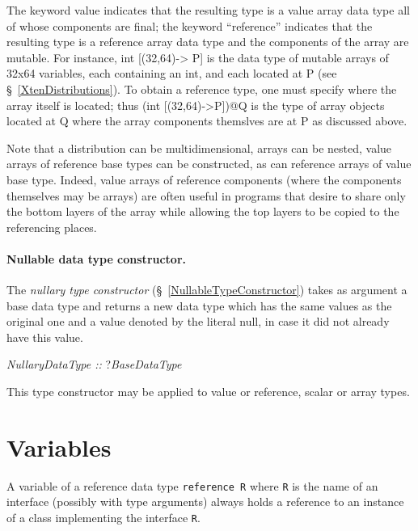 
The keyword {\cf value} indicates that the resulting type is a value
array data type all of whose components are final; the keyword
``reference'' indicates that the resulting type is a reference array
data type and the components of the array are mutable.  For instance,
{\cf int [(32,64)-> P]} is the data type of mutable arrays of {\cf
32x64} variables, each containing an {\cf int}, and each located at
{\cf P} (see \S~\ref{XtenDistributions}).  To obtain a reference type,
one must specify where the array itself is located; thus {\cf (int
[(32,64)->P])@Q} is the type of array objects located at {\cf Q} where
the array components themslves are at {\cf P} as discussed above.

Note that a distribution can be multidimensional, arrays can be
nested, value arrays of reference base types can be constructed, as
can reference arrays of value base type.  Indeed, value arrays of
reference components (where the components themselves may be arrays)
are often useful in programs that desire to share only the bottom
layers of the array while allowing the top layers to be copied to the
referencing places.

\paragraph{Nullable data type constructor.}
The {\em nullary type constructor} (\S~\ref{NullableTypeConstructor})
takes as argument a base data type and returns a new data type which
has the same values as the original one and a value denoted by the
literal {\cf null}, in case it did not already have this value.
\begin{x10}
{\em NullaryDataType ::}
   ?{\em{}BaseDataType}
\end{x10}

This type constructor may be applied to value or reference, scalar or
array types.


\section{Variables}\label{XtenVariables}

A variable of a reference data type {\tt reference R} where {\tt R} is
the name of an interface (possibly with type arguments) always holds a
reference to an instance of a class implementing the interface {\tt R}.


